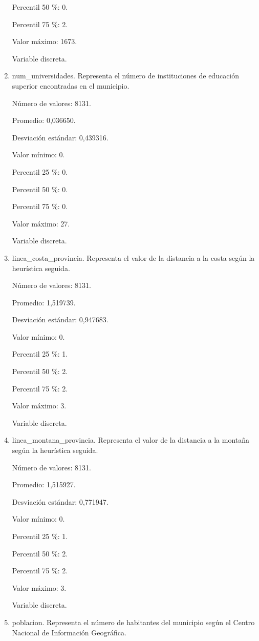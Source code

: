 \begin{enumerate}
	Percentil 50 \%: 0.
	
	Percentil 75 \%: 2.
	
	Valor máximo: 1673.
	
	Variable discreta.

	\item num\_universidades. Representa el número de instituciones de educación superior encontradas en el municipio.
	
	Número de valores: 8131.
	
	Promedio: 0,036650.
	
	Desviación estándar: 0,439316.
	
	Valor mínimo: 0.
	
	Percentil 25 \%: 0.
	
	Percentil 50 \%: 0.
	
	Percentil 75 \%: 0.
	
	Valor máximo: 27.
	
	Variable discreta.

	\item linea\_costa\_provincia. Representa el valor de la distancia a la costa según la heurística seguida.
	
	Número de valores: 8131.
	
	Promedio: 1,519739.
	
	Desviación estándar: 0,947683.
	
	Valor mínimo: 0.
	
	Percentil 25 \%: 1.
	
	Percentil 50 \%: 2.
	
	Percentil 75 \%: 2.
	
	Valor máximo: 3.
	
	Variable discreta.

	\item linea\_montana\_provincia. Representa el valor de la distancia a la montaña según la heurística seguida.
	
	Número de valores: 8131.
	
	Promedio: 1,515927.
	
	Desviación estándar: 0,771947.
	
	Valor mínimo: 0.
	
	Percentil 25 \%: 1.
	
	Percentil 50 \%: 2.
	
	Percentil 75 \%: 2.
	
	Valor máximo: 3.
	
	Variable discreta.

	\item poblacion. Representa el número de habitantes del municipio según el Centro Nacional de Información Geográfica.
	

\end{enumerate}
